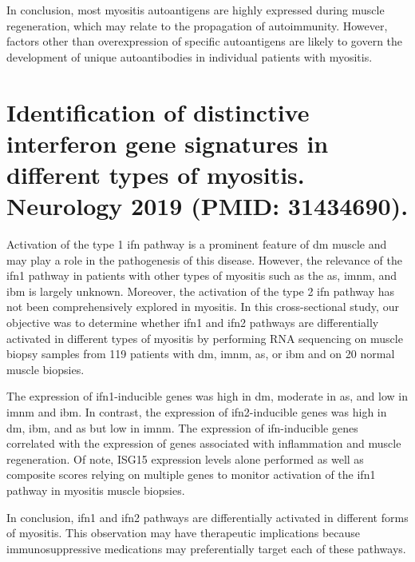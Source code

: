 In conclusion, most myositis autoantigens are highly expressed during muscle regeneration, which may relate to the propagation of autoimmunity. However, factors other than overexpression of specific autoantigens are likely to govern the development of unique autoantibodies in individual patients with myositis.


{\cleardoublepage}

\section{Identification of distinctive interferon gene signatures in different types of myositis. Neurology 2019 (PMID: 31434690).}
\label{sec:ifn}

Activation of the type 1 \gls{ifn} pathway is a prominent feature of \gls{dm} muscle and may play a role in the pathogenesis of this disease. However, the relevance of the \gls{ifn}1 pathway in patients with other types of myositis such as the \gls{as}, \gls{imnm}, and \gls{ibm} is largely unknown. Moreover, the activation of the type 2 \gls{ifn} pathway has not been comprehensively explored in myositis. In this cross-sectional study, our objective was to determine whether \gls{ifn}1 and \gls{ifn}2 pathways are differentially activated in different types of myositis by performing RNA sequencing on muscle biopsy samples from 119 patients with \gls{dm}, \gls{imnm}, \gls{as}, or \gls{ibm} and on 20 normal muscle biopsies.

The expression of \gls{ifn}1-inducible genes was high in \gls{dm}, moderate in \gls{as}, and low in \gls{imnm} and \gls{ibm}. In contrast, the expression of \gls{ifn}2-inducible genes was high in \gls{dm}, \gls{ibm}, and \gls{as} but low in \gls{imnm}. The expression of \gls{ifn}-inducible genes correlated with the expression of genes associated with inflammation and muscle regeneration. Of note, ISG15 expression levels alone performed as well as composite scores relying on multiple genes to monitor activation of the \gls{ifn}1 pathway in myositis muscle biopsies.

In conclusion, \gls{ifn}1 and \gls{ifn}2 pathways are differentially activated in different forms of myositis. This observation may have therapeutic implications because immunosuppressive medications may preferentially target each of these pathways.


{\cleardoublepage}

